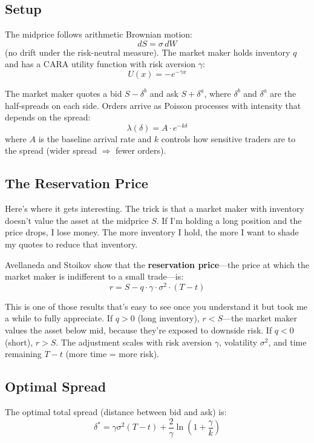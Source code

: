 \documentclass[11pt]{article}
\begin{document}
\subsection{Setup}

The midprice follows arithmetic Brownian motion:
\[
dS = \sigma \, dW
\]
(no drift under the risk-neutral measure). The market maker holds inventory $q$ and has a CARA utility function with risk aversion $\gamma$:
\[
U(x) = -e^{-\gamma x}
\]

The market maker quotes a bid $S - \delta^b$ and ask $S + \delta^a$, where $\delta^b$ and $\delta^a$ are the half-spreads on each side. Orders arrive as Poisson processes with intensity that depends on the spread:
\[
\lambda(\delta) = A \cdot e^{-k\delta}
\]
where $A$ is the baseline arrival rate and $k$ controls how sensitive traders are to the spread (wider spread $\Rightarrow$ fewer orders).

\subsection{The Reservation Price}

Here's where it gets interesting. The trick is that a market maker with inventory doesn't value the asset at the midprice $S$. If I'm holding a long position and the price drops, I lose money. The more inventory I hold, the more I want to shade my quotes to reduce that inventory.

Avellaneda and Stoikov show that the \textbf{reservation price}---the price at which the market maker is indifferent to a small trade---is:
\[
\boxed{r = S - q \cdot \gamma \cdot \sigma^2 \cdot (T - t)}
\]

This is one of those results that's easy to see once you understand it but took me a while to fully appreciate. If $q > 0$ (long inventory), $r < S$---the market maker values the asset below mid, because they're exposed to downside risk. If $q < 0$ (short), $r > S$. The adjustment scales with risk aversion $\gamma$, volatility $\sigma^2$, and time remaining $T - t$ (more time = more risk).

\subsection{Optimal Spread}

The optimal total spread (distance between bid and ask) is:
\[
\boxed{\delta^* = \gamma \sigma^2 (T-t) + \frac{2}{\gamma} \ln\!\left(1 + \frac{\gamma}{k}\right)}
\]
\end{document}
